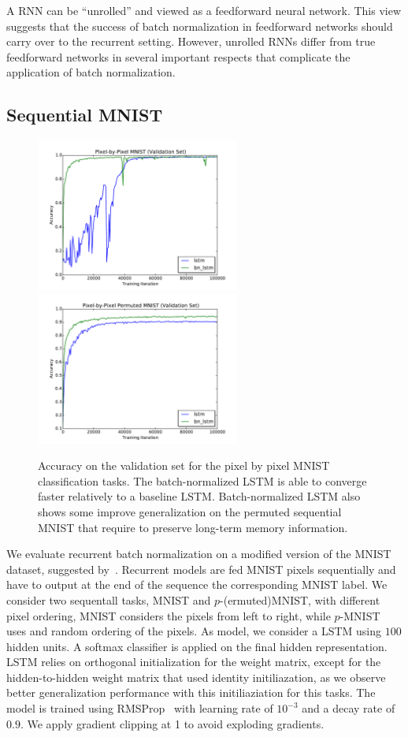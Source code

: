 \documentclass{article} %
\begin{document}
A RNN can be ``unrolled'' and viewed as a feedforward neural network.
This view suggests that the success of batch normalization in feedforward networks should carry over to the recurrent setting.
However, unrolled RNNs differ from true feedforward networks in several important respects that complicate the application of batch normalization.


\subsection{Sequential MNIST}
\label{sec:seqmnist}

\begin{figure}
\center
\includegraphics[width=6.7cm]{figures/unpermuted_valid.pdf}
\includegraphics[width=6.7cm]{figures/permuted_valid.pdf}
\caption{Accuracy on the validation set for the pixel by pixel MNIST classification tasks. The batch-normalized LSTM is able to converge faster relatively to a baseline LSTM.
  Batch-normalized  LSTM also shows some improve generalization on the permuted sequential MNIST that require to preserve long-term memory information.}
\label{fig:seqmnist_valid}
\end{figure}


We evaluate recurrent batch normalization on a modified version of the MNIST dataset, suggested by~\cite{le2015simple}.
Recurrent models are fed MNIST pixels sequentially and have to output at the end of the sequence the corresponding MNIST label.
We consider two sequentall tasks, MNIST and $p$-(ermuted)MNIST, with different pixel ordering, MNIST considers the pixels from left to right, while $p$-MNIST uses and random ordering of the pixels.
As model, we consider a LSTM using $100$ hidden units. A softmax classifier
is applied on the final hidden representation.
LSTM relies on orthogonal initialization for the weight matrix, except for the hidden-to-hidden weight matrix that used identity initiliazation, as we observe better generalization performance with this
initiliaziation for this tasks.
The model is trained using RMSProp~\cite{rmsprop} with learning rate of $10^{-3}$ and a decay rate of $0.9$. We apply gradient clipping at 1 to avoid exploding gradients.
\end{document}
